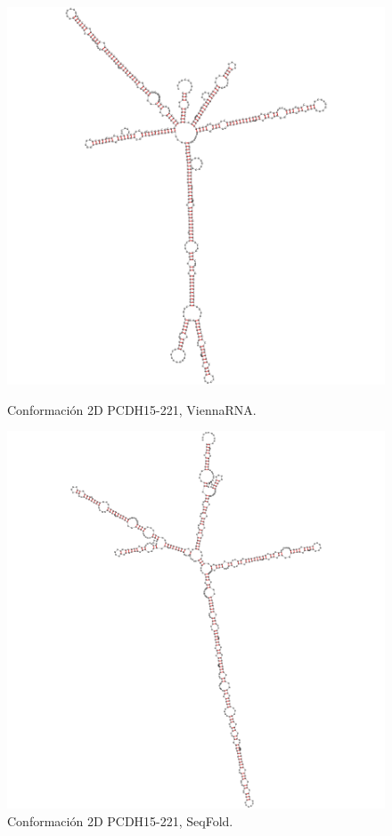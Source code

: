 \documentclass[a4paper,11pt,titlepage]{article}
\theoremstyle{definition}
\begin{document}
\begin{figure}[H]
    \centering
    \begin{minipage}[c]{0.45\textwidth}
        \centering
        \includegraphics[width=\textwidth]{images/PCDH15-221-db_vrna.png}
        \caption{Conformación 2D PCDH15-221, ViennaRNA.}
        \label{fig:PCDH15-221-vrna}
    \end{minipage}
    \hfill
    \begin{minipage}[c]{0.45\textwidth}
        \centering
        \includegraphics[width=\textwidth]{images/PCDH15-221-db_sqf.png}
        \caption{Conformación 2D PCDH15-221, SeqFold.}
        \label{fig:PCDH15-221-sqf}
    \end{minipage}
\end{figure}
\end{document}
